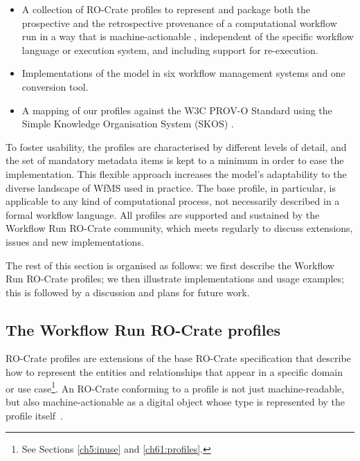 \begin{itemize}
\item   A collection of RO-Crate profiles to represent and package both the prospective and the retrospective provenance of a computational workflow run in a way that is machine-actionable \cite{Batista 2022},  independent of the specific workflow language or execution system, and including support for re-execution.
\item   Implementations of the model in six workflow management systems and one conversion tool.
\item   A mapping of our profiles against the W3C PROV-O Standard using the Simple Knowledge Organisation System (SKOS) \cite{Isaac 2009}.
\end{itemize}

To foster usability, the profiles are characterised by different levels of detail, and the set of mandatory metadata items is kept to a minimum in order to ease the implementation.
This flexible approach increases the model's adaptability to the diverse landscape of WfMS used in practice.
The base profile, in particular, is applicable to any kind of computational process, not necessarily described in a formal workflow language.
All profiles are supported and sustained by the Workflow Run RO-Crate community, which meets regularly to discuss extensions, issues and new implementations.

The rest of this section is organised as follows: we first describe the Workflow Run RO-Crate profiles; we then illustrate implementations and usage examples; this is followed by a discussion and plans for future work.


\subsection{The Workflow Run RO-Crate profiles}\label{ch54:the-workflow-run-ro-crate-profiles}

RO-Crate profiles are extensions of the base RO-Crate specification that describe how to represent the entities and relationships that appear in a specific domain or use case\footnote{See Sections \vref{ch5:inuse} and \vref{ch61:profiles}.}.
An RO-Crate conforming to a profile is not just machine-readable, but also machine-actionable as a digital object whose type is represented by the profile itself~\cite{Soiland-Reyes 2022c}.

